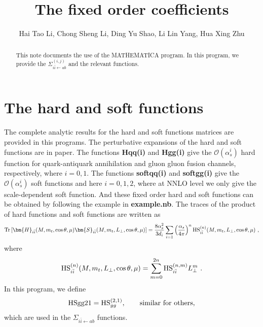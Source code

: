 \documentclass[letterpaper,aps,prd,,nofootinbib]{revtex4}
\begin{document}
\title{The fixed order coefficients}

\author{Hai Tao Li, Chong Sheng Li, Ding Yu Shao,  Li Lin Yang, Hua Xing Zhu}



\begin{abstract}
     This note documents the use of the MATHEMATICA program.
     In this program, we provide the   $\Sigma_{i\bar{i}\leftarrow ab}^{(i,j)}$
     and the relevant functions.
\end{abstract}
\maketitle

\section{The hard and soft functions}
The complete analytic results for the hard and soft functions matrices are provided in this programs. 
The perturbative expansions of the hard and soft functions are in paper.
The functions
{\bf{Hqq(i)}} and {\bf{Hgg(i)}} give the $\mathcal{O}(\alpha_s^{i})$  hard function
for quark-antiquark annihilation and gluon gluon fusion channels, respectively, where
$i=0,1$.
The functions {\bf{softqq(i)}} and {\bf{softgg(i)}} give the $\mathcal{O}(\alpha_s^{i})$ soft
functions and here $i=0,1,2$, where at NNLO level we only give the scale-dependent  soft function.
And these fixed order hard and soft functions can be obtained by following the example in {\bf{example.nb}}.
The traces of the product of hard functions and soft functions are written as
\begin{align}
       {\rm{Tr}}\left[
       \bm{H}_{i\bar{i}}(M,m_t, \cos\theta, \mu)
       \bm{S}_{i\bar{i}}(M,m_t,L_\perp, \cos\theta ,\mu)
       \right]= \frac{8 \alpha_s^2}{3 d_i} \sum_{i=1}  \left(\frac{\alpha_s}{4\pi}\right)^n
       {\rm{HS}}_{i\bar{i}}^{(n)}(M,m_t,L_\perp, \cos\theta ,\mu)\ ,
\end{align}
where
\begin{align}
       {\rm{HS}}^{(n)}_{i\bar{i}}(M,m_t,L_\perp, \cos\theta, \mu)=
       \sum_{m=0}^{2n} {\rm{HS}}^{(n,m)}_{i\bar{i}} L_\perp^{m}\ .
\end{align}
In this program, we define
\begin{align}
       {\rm{HSgg21}} = {\rm{HS}}^{(2,1)}_{gg}, \qquad \rm{similar\ for\ others,}
\end{align}
which are used in the $\Sigma_{i\bar{i}\leftarrow ab}$ functions.
\end{document}
